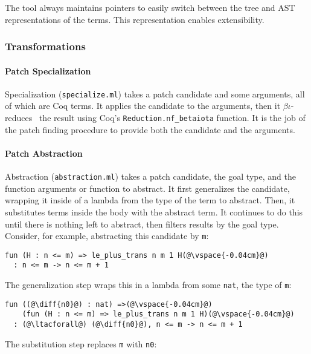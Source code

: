 The tool always maintains pointers to easily switch between the tree and AST representations of the terms.
This representation enables extensibility.

\subsubsection{Transformations}
\label{sec:pumpkin-impl-trans}

\paragraph{Patch Specialization} Specialization (\lstinline{specialize.ml}) takes a patch candidate and some arguments,
all of which are Coq terms.
It applies the candidate to the arguments, then it $\beta\iota$-reduces~\cite{equality} the result using Coq's
\lstinline{Reduction.nf_betaiota} function. It is the job of the 
patch finding procedure to provide both the candidate and the arguments.

\paragraph{Patch Abstraction} Abstraction (\lstinline{abstraction.ml}) takes a patch candidate, 
the goal type, and the function arguments or function to abstract.
It first generalizes the candidate, wrapping it inside of a lambda from the type of the term to abstract.
Then, it substitutes terms inside the body with the abstract term.
It continues to do this until there is nothing left to abstract, then filters results by the goal type.
Consider, for example, abstracting this candidate by \lstinline{m}:

\begin{lstlisting}[language=coq]
  fun (H : n <= m) => le_plus_trans n m 1 H(@\vspace{-0.04cm}@)
  : n <= m -> n <= m + 1
\end{lstlisting}
The generalization step wraps this in a lambda from some \lstinline{nat}, the type of \lstinline{m}:

\begin{lstlisting}[language=coq]
  fun ((@\diff{n0}@) : nat) =>(@\vspace{-0.04cm}@)
    (fun (H : n <= m) => le_plus_trans n m 1 H)(@\vspace{-0.04cm}@)
  : (@\ltacforall@) (@\diff{n0}@), n <= m -> n <= m + 1
\end{lstlisting}
The substitution step replaces \lstinline{m} with \lstinline{n0}:

